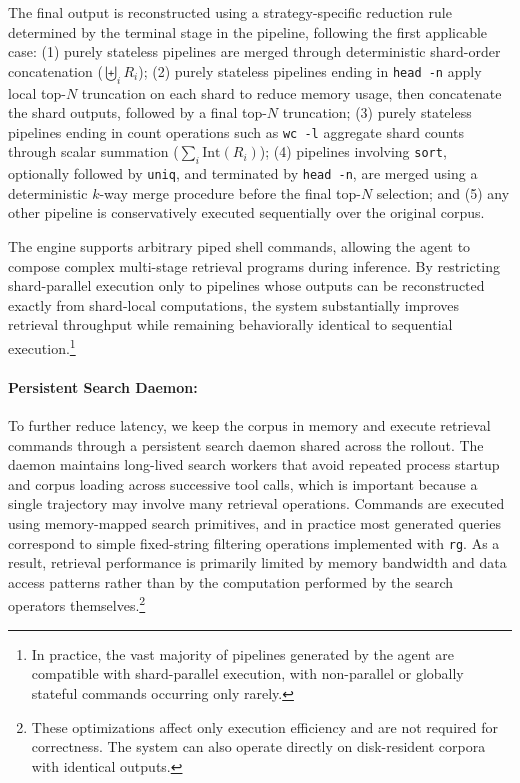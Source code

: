 \documentclass{article} %
\begin{document}
The final output is reconstructed using a strategy-specific reduction rule determined by the terminal stage in the pipeline, following the first applicable case: (1) purely stateless pipelines are merged through deterministic shard-order concatenation ($\biguplus_i R_i$); (2) purely stateless pipelines ending in \texttt{head -n} apply local top-$N$ truncation on each shard to reduce memory usage, then concatenate the shard outputs, followed by a final top-$N$ truncation; (3) purely stateless pipelines ending in count operations such as \texttt{wc -l} aggregate shard counts through scalar summation ($\sum_i \mathrm{Int}(R_i)$); (4) pipelines involving \texttt{sort}, optionally followed by \texttt{uniq}, and terminated by \texttt{head -n}, are merged using a deterministic $k$-way merge procedure \citep{cormen2001algorithms} before the final top-$N$ selection; and (5) any other pipeline is conservatively executed sequentially over the original corpus.

The engine supports arbitrary piped shell commands, allowing the agent to compose complex multi-stage retrieval programs during inference. By restricting shard-parallel execution only to pipelines whose outputs can be reconstructed exactly from shard-local computations, the system substantially improves retrieval throughput while remaining behaviorally identical to sequential execution.\footnote{In practice, the vast majority of pipelines generated by the agent are compatible with shard-parallel execution, with non-parallel or globally stateful commands occurring only rarely.}


\paragraph{Persistent Search Daemon:}
To further reduce latency, we keep the corpus in memory and execute retrieval commands through a persistent search daemon shared across the rollout. The daemon maintains long-lived search workers that avoid repeated process startup and corpus loading across successive tool calls, which is important because a single trajectory may involve many retrieval operations. Commands are executed using memory-mapped search primitives, and in practice most generated queries correspond to simple fixed-string filtering operations implemented with \texttt{rg}. As a result, retrieval performance is primarily limited by memory bandwidth and data access patterns rather than by the computation performed by the search operators themselves.\footnote{These optimizations affect only execution efficiency and are not required for correctness. The system can also operate directly on disk-resident corpora with identical outputs.}
\end{document}

